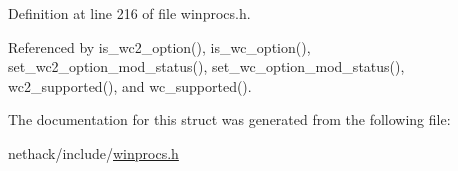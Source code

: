 Definition at line 216 of file winprocs.\+h.



Referenced by is\+\_\+wc2\+\_\+option(), is\+\_\+wc\+\_\+option(), set\+\_\+wc2\+\_\+option\+\_\+mod\+\_\+status(), set\+\_\+wc\+\_\+option\+\_\+mod\+\_\+status(), wc2\+\_\+supported(), and wc\+\_\+supported().



The documentation for this struct was generated from the following file\+:\begin{DoxyCompactItemize}
\item 
nethack/include/\hyperlink{winprocs_8h}{winprocs.\+h}\end{DoxyCompactItemize}
